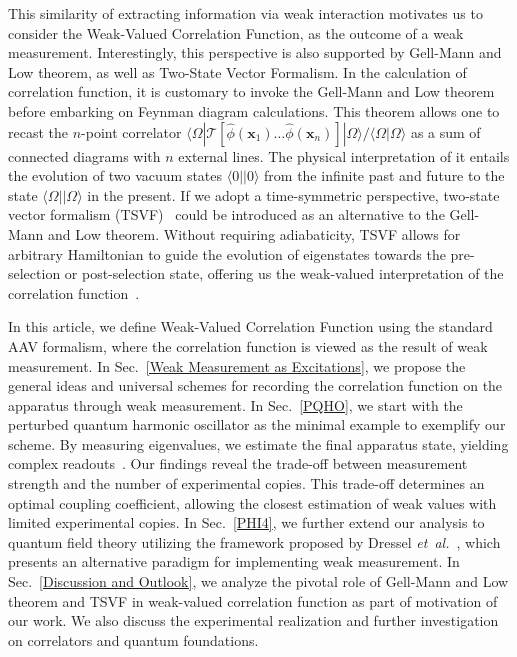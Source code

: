 \documentclass[twocolumn,pra,aps,superscriptaddress]{revtex4-2}
\begin{document}
This similarity of extracting information via weak interaction motivates us to consider the Weak-Valued Correlation Function, as the outcome of a weak measurement. Interestingly, this perspective is also supported by Gell-Mann and Low theorem, as well as Two-State Vector Formalism. In the calculation of correlation function, it is customary to invoke the Gell-Mann and Low theorem~\cite{GL} before embarking on Feynman diagram calculations. This theorem allows one to recast the $n$-point correlator $\langle\Omega| \mathcal{T}[\hat{\phi}(\textbf{x}_1)\ldots\hat{\phi}(\textbf{x}_n)]|\Omega\rangle/\langle\Omega|\Omega\rangle$ as a sum of connected diagrams with $n$ external lines.  The physical interpretation of it entails the evolution of two vacuum states $\langle 0||0\rangle$ from the infinite past and future to the state $\langle\Omega||\Omega\rangle$ in the present. If we adopt a time-symmetric perspective, two-state vector formalism (TSVF)~\cite{tsvf,tsvfreview} could be introduced as an alternative to the Gell-Mann and Low theorem. Without requiring adiabaticity, TSVF allows for arbitrary Hamiltonian to guide the evolution of eigenstates towards the pre-selection or post-selection state, offering us the weak-valued interpretation of the correlation function~\cite{sagawa}.

In this article, we define Weak-Valued Correlation Function using the standard AAV formalism, where the correlation function is viewed as the result of weak measurement. In Sec.~\ref{Weak Measurement as Excitations}, we propose the general ideas and universal schemes for recording the correlation function on the apparatus through weak measurement. In Sec.~\ref{PQHO}, we start with the perturbed quantum harmonic oscillator as the minimal example to exemplify our scheme.
By measuring eigenvalues, we estimate the final apparatus state, yielding complex readouts~\cite{jozsa}. Our findings reveal the trade-off between measurement strength and the number of experimental copies. This trade-off determines an optimal coupling coefficient, allowing the closest estimation of weak values with limited experimental copies. In Sec.~\ref{PHI4}, we further extend our analysis to quantum field theory utilizing the framework proposed by Dressel \textit {et~al.}~\cite{dressel}, which presents an alternative paradigm for implementing weak measurement. In Sec.~\ref{Discussion and Outlook}, we analyze the pivotal role of Gell-Mann and Low theorem and TSVF in weak-valued correlation function as part of motivation of our work. We also discuss the experimental realization and further investigation on correlators and quantum foundations.
\end{document}
